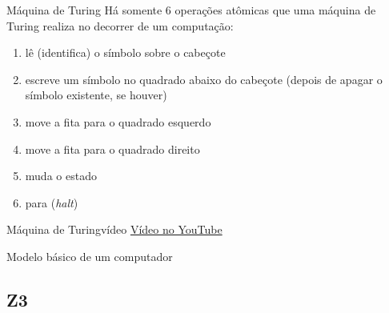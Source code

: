 \begin{frame}{Máquina de Turing}
Há somente 6 operações atômicas que uma máquina de Turing realiza no
decorrer de um computação:

\begin{enumerate}
\item lê (identifica) o símbolo sobre o cabeçote
\item escreve um símbolo no quadrado abaixo do cabeçote (depois de
  apagar o símbolo existente, se houver)
\item move a fita para o quadrado esquerdo
\item move a fita para o quadrado direito
\item muda o estado 
\item para ({\it halt\/})
\end{enumerate}
\end{frame}

\begin{frame}{Máquina de Turing}{vídeo}
\href{http://www.youtube.com/watch?v=E3keLeMwfHY}{Vídeo no YouTube}
\end{frame}

\begin{frame}{Modelo básico de um computador}
\begin{center}
\end{center}
\end{frame}

\subsection{Z3}

